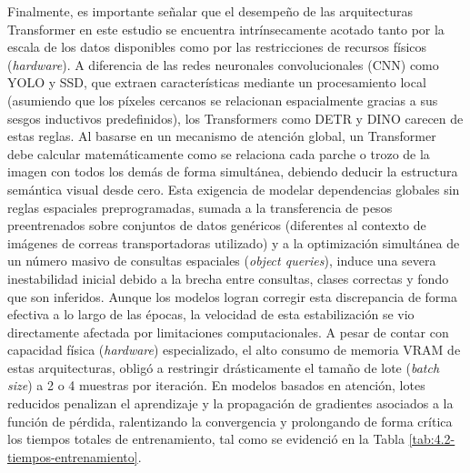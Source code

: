 Finalmente, es importante señalar que el desempeño de las arquitecturas Transformer en este estudio se encuentra intrínsecamente acotado tanto por la escala de los datos disponibles como por las restricciones de recursos físicos (\textit{hardware}). A diferencia de las redes neuronales convolucionales (CNN) como YOLO y SSD, que extraen características mediante un procesamiento local (asumiendo que los píxeles cercanos se relacionan espacialmente gracias a sus sesgos inductivos predefinidos), los Transformers como DETR y DINO carecen de estas reglas. Al basarse en un mecanismo de atención global, un Transformer debe calcular matemáticamente como se relaciona cada parche o trozo de la imagen con todos los demás de forma simultánea, debiendo deducir la estructura semántica visual desde cero. Esta exigencia de modelar dependencias globales sin reglas espaciales preprogramadas, sumada a la transferencia de pesos preentrenados sobre conjuntos de datos genéricos (diferentes al contexto de imágenes de correas transportadoras utilizado) y a la optimización simultánea de un número masivo de consultas espaciales (\textit{object queries}), induce una severa inestabilidad inicial debido a la brecha entre consultas, clases correctas y fondo que son inferidos. Aunque los modelos logran corregir esta discrepancia de forma efectiva a lo largo de las épocas, la velocidad de esta estabilización se vio directamente afectada por limitaciones computacionales. A pesar de contar con capacidad física (\textit{hardware}) especializado, el alto consumo de memoria VRAM de estas arquitecturas, obligó a restringir drásticamente el tamaño de lote (\textit{batch size}) a 2 o 4 muestras por iteración. En modelos basados en atención, lotes reducidos penalizan el aprendizaje y la propagación de gradientes asociados a la función de pérdida, ralentizando la convergencia y prolongando de forma crítica los tiempos totales de entrenamiento, tal como se evidenció en la Tabla \ref{tab:4.2-tiempos-entrenamiento}.